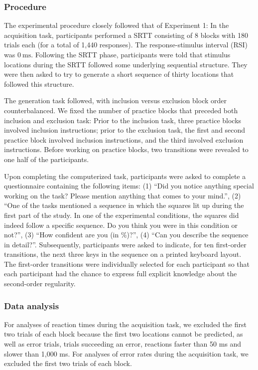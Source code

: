 \documentclass[man]{apa6}
\theoremstyle{definition}
\theoremstyle{definition}
\theoremstyle{definition}
\theoremstyle{remark}
\begin{document}
\subsubsection{Procedure}\label{procedure-2}

The experimental procedure closely followed that of Experiment 1: In the
acquisition task, participants performed a SRTT consisting of 8 blocks
with 180 trials each (for a total of 1,440 responses). The
response-stimulus interval (RSI) was \(0~\text{ms}\). Following the SRTT
phase, participants were told that stimulus locations during the SRTT
followed some underlying sequential structure. They were then asked to
try to generate a short sequence of thirty locations that followed this
structure.

The generation task followed, with inclusion versus exclusion block
order counterbalanced. We fixed the number of practice blocks that
preceded both inclusion and exclusion task: Prior to the inclusion task,
three practice blocks involved inclusion instructions; prior to the
exclusion task, the first and second practice block involved inclusion
instructions, and the third involved exclusion instructions. Before
working on practice blocks, two transitions were revealed to one half of
the participants.

Upon completing the computerized task, participants were asked to
complete a questionnaire containing the following items: (1)
\enquote{Did you notice anything special working on the task? Please
mention anything that comes to your mind.}, (2) \enquote{One of the
tasks mentioned a sequence in which the squares lit up during the first
part of the study. In one of the experimental conditions, the squares
did indeed follow a specific sequence. Do you think you were in this
condition or not?}, (3) \enquote{How confident are you (in \%)?}, (4)
\enquote{Can you describe the sequence in detail?}. Subsequently,
participants were asked to indicate, for ten first-order transitions,
the next three keys in the sequence on a printed keyboard layout. The
first-order transitions were individually selected for each participant
so that each participant had the chance to express full explicit
knowledge about the second-order regularity.

\subsubsection{Data analysis}\label{data-analysis-2}

For analyses of reaction times during the acquisition task, we excluded
the first two trials of each block because the first two locations
cannot be predicted, as well as error trials, trials succeeding an
error, reactions faster than 50 ms and slower than 1,000 ms. For
analyses of error rates during the acquisition task, we excluded the
first two trials of each block.
\end{document}
